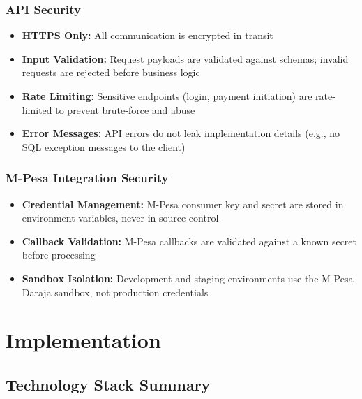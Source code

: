 \documentclass[12pt, a4paper, twoside, openright]{report}
\begin{document}
\subsection{API Security}

\begin{itemize}
    \item \textbf{HTTPS Only:} All communication is encrypted in transit
    \item \textbf{Input Validation:} Request payloads are validated against schemas; invalid requests are rejected before business logic
    \item \textbf{Rate Limiting:} Sensitive endpoints (login, payment initiation) are rate-limited to prevent brute-force and abuse
    \item \textbf{Error Messages:} API errors do not leak implementation details (e.g., no SQL exception messages to the client)
\end{itemize}

\subsection{M-Pesa Integration Security}

\begin{itemize}
    \item \textbf{Credential Management:} M-Pesa consumer key and secret are stored in environment variables, never in source control
    \item \textbf{Callback Validation:} M-Pesa callbacks are validated against a known secret before processing
    \item \textbf{Sandbox Isolation:} Development and staging environments use the M-Pesa Daraja sandbox, not production credentials
\end{itemize}


\chapter{Implementation}

\section{Technology Stack Summary}
\end{document}
